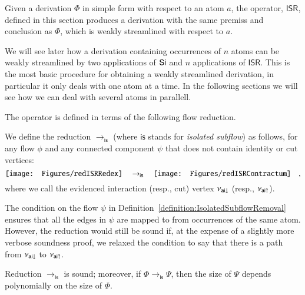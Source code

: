 \newcommand{\ISR}{\mathsf{ISR}}

Given a derivation $\Phi$ in simple form with respect to an atom $a$, the operator, $\ISR$, defined in this section produces a derivation with the same premiss and conclusion as $\Phi$, which is weakly streamlined with respect to $a$.


We will see later how a derivation containing occurrences of $n$ atoms can be weakly streamlined by two applications of $\mathsf{Si}$ and $n$ applications of $\ISR$. This is the most basic procedure for obtaining a weakly streamlined derivation, in particular it only deals with one atom at a time. In the following sections we will see how we can deal with several atoms in parallell.

The operator is defined in terms of the following flow reduction.


\newcommand{\fris}{{\mathsf{is}}}
\begin{definition}\label{definition:IsolatedSubflowRemoval}
We define the reduction $\to_\fris$ (where $\fris$ stands for \emph{isolated subflow}) as follows, for any flow $\phi$ and any connected component $\psi$ that does not contain identity or cut vertices:
\[
\vcenter{\hbox{\texttt{[image: Figures/redISRRedex]}}}
\quad\to_\fris\quad
\vcenter{\hbox{\texttt{[image: Figures/redISRContractum]}}}
\quad,
\]
where we call the evidenced interaction (resp., cut) vertex $\nu_{{\mathsf{ai}}{\downarrow}}$ (resp., $\nu_{{\mathsf{ai}}{\uparrow}}$).
\end{definition}


\begin{remark}\label{remark:IsolatedSubflowRemovalRestriction}
The condition on the flow $\psi$ in Definition~\vref{definition:IsolatedSubflowRemoval} ensures that all the edges in $\psi$ are mapped to from occurrences of the same atom. However, the reduction would still be sound if, at the expense of a slightly more verbose soundness proof, we relaxed the condition to say that there is a path from $\nu_{{\mathsf{ai}}{\downarrow}}$ to $\nu_{{\mathsf{ai}}{\uparrow}}$.
\end{remark}

\begin{theorem}\label{theorem:SoundIsolatedSubflowRemoval}
Reduction\/ $\to_\fris$ is sound; moreover, if\/ $\Phi\to_\fris\Psi$, then the size of\/ $\Psi$ depends  polynomially on the size of\/ $\Phi$.
\end{theorem}


